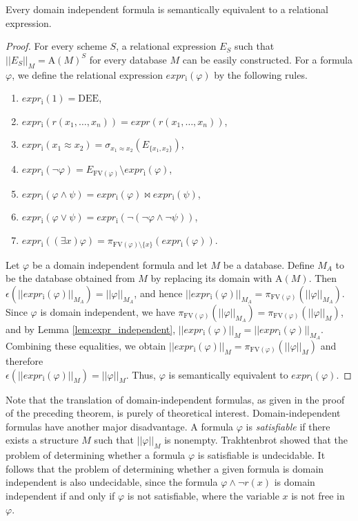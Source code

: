 \documentclass{lmcs}
\def\A{\textrm{A}}
\def\expr{expr}
\def\expri{\expr_\textrm{i}}
\def\FV{\textrm{FV}}
\def\DEE{\textrm{DEE}}
\begin{document}
\begin{thm}
Every domain independent formula is semantically equivalent to a relational expression. 
\end{thm}
\begin{proof}
For every scheme $S$, a relational expression $E_S$ such that $||E_S||_M={\A(M)}^S$ for every database $M$ can be easily constructed. For a formula $\varphi$, we define the relational expression $\expri(\varphi)$ by the following rules.
\begin{enumerate}
\item $\expri(1)=\DEE$,
\item $\expri(r(x_1,\ldots,x_n))=\expr(r(x_1,\ldots,x_n))$,
\item $\expri(x_1\approx x_2)=\sigma_{x_1\approx x_2}(E_{\{x_1,x_2\}})$,
\item $\expri(\neg\varphi)=E_{\FV(\varphi)}\setminus\expri(\varphi)$,
\item $\expri(\varphi\wedge\psi)=\expri(\varphi)\bowtie\expri(\psi)$,
\item $\expri(\varphi\vee\psi)=\expri(\neg(\neg\varphi\wedge\neg\psi))$,
\item $\expri((\exists x)\varphi)=\pi_{\FV(\varphi)\setminus\{x\}}(\expri(\varphi))$.
\end{enumerate}

Let $\varphi$ be a domain independent formula and let $M$ be a database. Define $M_A$ to be the database obtained from $M$ by replacing its domain with $\A(M)$. Then $\epsilon(||\expri(\varphi)||_{M_A})=||\varphi||_{M_A}$, and hence $||\expri(\varphi)||_{M_A}=\pi_{\FV(\varphi)}(||\varphi||_{M_A})$. Since $\varphi$ is domain independent, we have $\pi_{\FV(\varphi)}(||\varphi||_{M_A})=\pi_{\FV(\varphi)}(||\varphi||_{M})$, and by Lemma \ref{lem:expr_independent},  $||\expri(\varphi)||_M=||\expri(\varphi)||_{M_A}$. Combining these equalities, we obtain  $||\expri(\varphi)||_M=\pi_{\FV(\varphi)}(||\varphi||_M)$ and therefore \\$\epsilon(||\expri(\varphi)||_M)=||\varphi||_M$. Thus, $\varphi$ is semantically equivalent to $\expri(\varphi)$.
\end{proof}
Note that the translation of domain-independent formulas, as given in the proof of the preceding theorem, is purely of theoretical interest. Domain-independent formulas have another major disadvantage. 
A formula  $\varphi$ is \emph{satisfiable} if there exists a structure $M$ such that $||\varphi||_M$ is nonempty. 
Trakhtenbrot \cite{Trakhtenbrot1950} showed that the problem of determining whether a formula $\varphi$ is satisfiable is undecidable. 
It follows that the problem of determining whether a given formula is domain independent is also undecidable, since the formula $\varphi\wedge\neg r(x)$ is domain independent if and only if $\varphi$ is not satisfiable, where the variable $x$ is not free in $\varphi$. 
\end{document}
